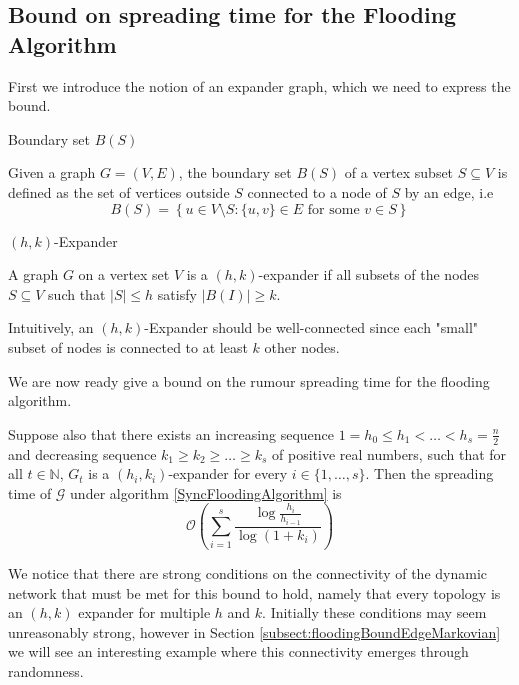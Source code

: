 

\subsection{Bound on spreading time for the Flooding Algorithm}

First we introduce the notion of an expander graph, which we need to express the bound.

\begin{definition}
	Boundary set $B(S)$

	\noindent 
	Given a graph $G=(V,E)$, the boundary set $B(S)$ of a vertex subset $S \subseteq V$ is defined as the set of vertices outside $S$ connected to a node of $S$ by an edge, i.e
	$$
		B(S) = \left\{u \in V \setminus S : \{u, v\} \in E \text{ for some } v \in S \right\}
	$$
\end{definition}

\begin{definition}
	$(h, k)$-Expander

	\noindent
	A graph $G$ on a vertex set $V$ is a $(h, k)$-expander if all subsets of the nodes $S \subseteq V$ such that $|S| \leq h$ satisfy $|B(I)| \geq k$.
\end{definition}

Intuitively, an $(h, k)$-Expander should be well-connected since each "small" subset of nodes is connected to at least $k$ other nodes.  

We are now ready give a bound on the rumour spreading time for the flooding algorithm.

\begin{theorem}\label{theorem:DeterministicFloodingBound}
	\ModelIntro Suppose also that there exists an increasing sequence $1 = h_0 \leq h_1 < \dots < h_s = \frac{n}{2}$ and decreasing sequence $k_1 \geq k_2 \geq \dots \geq k_s$ of positive real numbers, such that for all $t \in \mathbb{N}$, $G_t$ is a $(h_i, k_i)$-expander for every $i \in \{1, \dots , s\}$. Then the spreading time of $\mathcal{G}$ under algorithm \ref{SyncFloodingAlgorithm} is
	$$
		\mathcal{O}\left(\sum_{i=1}^s \frac{\log \frac{h_i}{h_{i-1}}}{\log(1+k_i)}\right)
	$$
\end{theorem}


We notice that there are strong conditions on the connectivity of the dynamic network that must be met for this bound to hold, namely that every topology is an $(h,k)$ expander for multiple $h$ and $k$. Initially these conditions may seem unreasonably strong, however in Section \ref{subsect:floodingBoundEdgeMarkovian} we will see an interesting example where this connectivity emerges through randomness.

